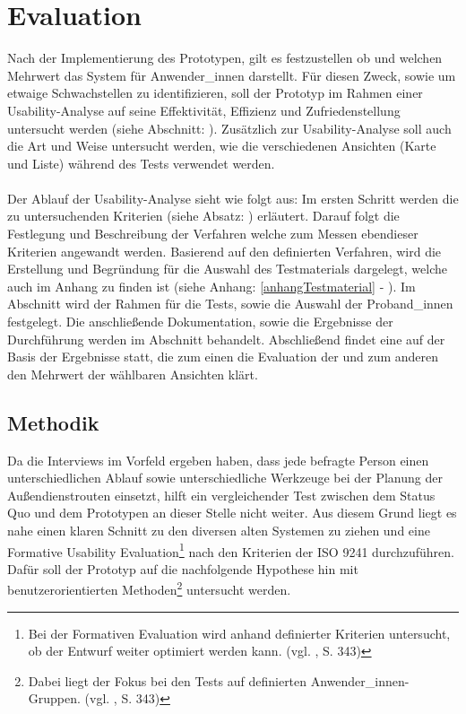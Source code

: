 \documentclass[Bachelorarbeit.tex]{subfiles}
\begin{document}
\chapter{Evaluation}
\label{chap:evalutation}
Nach der Implementierung des Prototypen, gilt es festzustellen ob und welchen Mehrwert das System für Anwender\_innen darstellt. 
Für diesen Zweck, sowie um etwaige Schwachstellen zu identifizieren, soll der Prototyp im Rahmen einer Usability-Analyse auf seine Effektivität, Effizienz und Zufriedenstellung \cite[vgl.][Abs.: 3]{Iso9241_11} untersucht werden (siehe Abschnitt: ).
Zusätzlich zur Usability-Analyse soll auch die Art und Weise untersucht werden, wie die verschiedenen Ansichten (Karte und Liste) während des Tests verwendet werden.\\
\\
Der Ablauf der Usability-Analyse sieht wie folgt aus:
Im ersten Schritt werden die zu untersuchenden Kriterien (siehe Absatz: ) erläutert.
Darauf folgt die Festlegung und Beschreibung der Verfahren welche zum Messen ebendieser Kriterien angewandt werden.
Basierend auf den definierten Verfahren, wird die Erstellung und Begründung für die Auswahl des Testmaterials dargelegt, welche auch im Anhang zu finden ist (siehe Anhang: \ref{anhangTestmaterial} - ).
Im Abschnitt  wird der Rahmen für die Tests, sowie die Auswahl der Proband\_innen festgelegt.
Die anschließende Dokumentation, sowie die Ergebnisse der Durchführung werden im Abschnitt  behandelt.
Abschließend findet eine  auf der Basis der Ergebnisse statt, die zum einen die Evaluation der  und zum anderen den Mehrwert der wählbaren Ansichten  klärt.

\section{Methodik}
\label{Methodik}

Da die Interviews im Vorfeld ergeben haben, dass jede befragte Person einen unterschiedlichen Ablauf sowie unterschiedliche Werkzeuge bei der Planung der Außendienstrouten einsetzt, hilft ein vergleichender Test zwischen dem Status Quo und dem Prototypen an dieser Stelle nicht weiter.
Aus diesem Grund liegt es nahe einen klaren Schnitt zu den diversen alten Systemen zu ziehen und eine Formative Usability Evaluation\footnote{Bei der Formativen Evaluation wird anhand definierter Kriterien untersucht, ob der Entwurf weiter optimiert werden kann. (vgl. \cite{Burmester}, S. 343)} nach den Kriterien der ISO 9241 durchzuführen.
Dafür soll der Prototyp auf die nachfolgende Hypothese hin mit benutzerorientierten Methoden\footnote{Dabei liegt der Fokus bei den Tests auf definierten Anwender\_innen-Gruppen. (vgl. \cite{Burmester}, S. 343)} untersucht werden.
\end{document}
